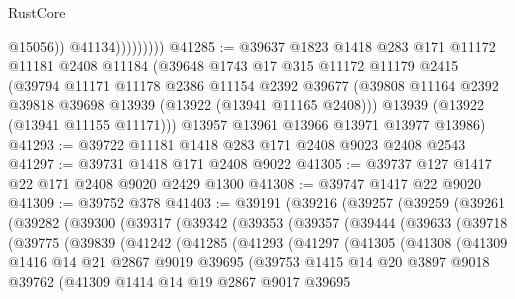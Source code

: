 \begin{lexlean}{RustCore}
\begin{coremodule}
                          @15056))
                      @41134)))))))))
@41285 := @39637
    @1823
    @1418
    @283
    @171
    @11172
    @11181
    @2408
    @11184
    (@39648
      @1743
      @17
      @315
      @11172
      @11179
      @2415
      (@39794
        @11171
        @11178
        @2386
        @11154
        @2392
        @39677
        (@39808 @11164 @2392 @39818 @39698 @13939 (@13922 (@13941 @11165 @2408)))
        @13939
        (@13922 (@13941 @11155 @11171)))
      @13957
      @13961
      @13966
      @13971
      @13977
      @13986)
@41293 := @39722 @11181 @1418 @283 @171 @2408 @9023 @2408 @2543
@41297 := @39731 @1418 @171 @2408 @9022
@41305 := @39737 @127 @1417 @22 @171 @2408 @9020 @2429 @1300
@41308 := @39747 @1417 @22 @9020
@41309 := @39752 @378
@41403 := @39191
    (@39216
      (@39257
        (@39259
          (@39261
            (@39282
              (@39300
                (@39317
                  (@39342
                    (@39353
                      (@39357
                        (@39444
                          (@39633
                            (@39718
                              (@39775
                                (@39839
                                  (@41242
                                    (@41285
                                      (@41293
                                        (@41297
                                          (@41305
                                            (@41308
                                              (@41309
                                                @1416
                                                @14
                                                @21
                                                @2867
                                                @9019
                                                @39695
                                                (@39753
                                                  @1415
                                                  @14
                                                  @20
                                                  @3897
                                                  @9018
                                                  @39762
                                                  (@41309
                                                    @1414
                                                    @14
                                                    @19
                                                    @2867
                                                    @9017
                                                    @39695

\end{coremodule}
\end{lexlean}
